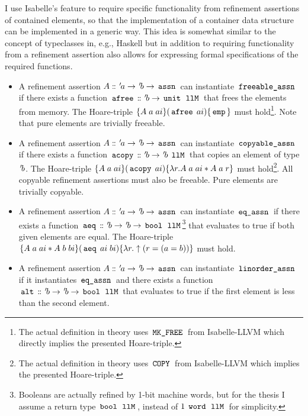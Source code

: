 I use Isabelle's  feature to require specific functionality from refinement assertions of contained elements, so that the implementation of a container data structure can be implemented in a generic way.
This idea is somewhat similar to the concept of typeclasses in, e.g., Haskell but in addition to requiring functionality from a refinement assertion also allows for expressing formal specifications of the required functions.
\begin{itemize}
	\item A refinement assertion $A \mathrel{\mathord{:}\mkern-1.2mu\mathord{:}} {\mskip2mu '\mskip-2mua} \rightarrow {\mskip2mu '\mskip-2mub} \rightarrow \,\text{\ttfamily assn}\,$ can instantiate $\,\text{\ttfamily freeable\_assn}\,$ if there exists a function $\,\text{\ttfamily afree}\, \mathrel{\mathord{:}\mkern-1.2mu\mathord{:}} {\mskip2mu '\mskip-2mub} \rightarrow \,\text{\ttfamily unit}\, \; \,\text{\ttfamily llM}\,$ that frees the elements from memory. The Hoare-triple $\{A \; a \; ai\}(\,\text{\ttfamily afree}\, \; ai)\{\,\text{\ttfamily emp}\,\}$ must hold\footnote{The actual definition in theory  uses $\,\text{\ttfamily MK\_FREE}\,$ from Isabelle-LLVM which directly implies the presented Hoare-triple.}. Note that pure elements are trivially freeable.
	\item A refinement assertion $A \mathrel{\mathord{:}\mkern-1.2mu\mathord{:}} {\mskip2mu '\mskip-2mua} \rightarrow {\mskip2mu '\mskip-2mub} \rightarrow \,\text{\ttfamily assn}\,$ can instantiate $\,\text{\ttfamily copyable\_assn}\,$ if there exists a function $\,\text{\ttfamily acopy}\, \mathrel{\mathord{:}\mkern-1.2mu\mathord{:}} {\mskip2mu '\mskip-2mub} \rightarrow {\mskip2mu '\mskip-2mub} \; \,\text{\ttfamily llM}\,$ that copies an element of type ${\mskip2mu '\mskip-2mub}$.
	      The Hoare-triple $\{A \; a \; ai\}(\,\text{\ttfamily acopy}\, \; ai)\{\lambda r. A \; a \; ai \ast A \; a \; r\}$ must hold\footnote{The actual definition in theory  uses $\,\text{\ttfamily COPY}\,$ from Isabelle-LLVM which implies the presented Hoare-triple.}.
	      All copyable refinement assertions must also be freeable.
	      Pure elements are trivially copyable.
	\item A refinement assertion $A \mathrel{\mathord{:}\mkern-1.2mu\mathord{:}} {\mskip2mu '\mskip-2mua} \rightarrow {\mskip2mu '\mskip-2mub} \rightarrow \,\text{\ttfamily assn}\,$ can instantiate $\,\text{\ttfamily eq\_assn}\,$ if there exists a function $\,\text{\ttfamily aeq}\, \mathrel{\mathord{:}\mkern-1.2mu\mathord{:}} {\mskip2mu '\mskip-2mub} \rightarrow {\mskip2mu '\mskip-2mub} \rightarrow \,\text{\ttfamily bool}\, \; \,\text{\ttfamily llM}\,$\footnote{Booleans are actually refined by 1-bit machine words, but for the thesis I assume a return type $\,\text{\ttfamily bool}\, \; \,\text{\ttfamily llM}\,$, instead of $1 \; \,\text{\ttfamily word}\, \; \,\text{\ttfamily llM}\,$ for simplicity.} that evaluates to true if both given elements are equal.
	      The Hoare-triple $\{A \; a \; ai \ast A \; b \; bi\}(\,\text{\ttfamily aeq}\, \; ai \; bi)\{\lambda r. \uparrow(r = (a=b))\}$ must hold.
	\item A refinement assertion $A \mathrel{\mathord{:}\mkern-1.2mu\mathord{:}} {\mskip2mu '\mskip-2mua} \rightarrow {\mskip2mu '\mskip-2mub} \rightarrow \,\text{\ttfamily assn}\,$ can instantiate $\,\text{\ttfamily linorder\_assn}\,$ if it instantiates $\,\text{\ttfamily eq\_assn}\,$ and there exists a function $\,\text{\ttfamily alt}\, \mathrel{\mathord{:}\mkern-1.2mu\mathord{:}} {\mskip2mu '\mskip-2mub} \rightarrow {\mskip2mu '\mskip-2mub} \rightarrow \,\text{\ttfamily bool}\, \; \,\text{\ttfamily llM}\,$ that evaluates to true if the first element is less than the second element.

\end{itemize}
